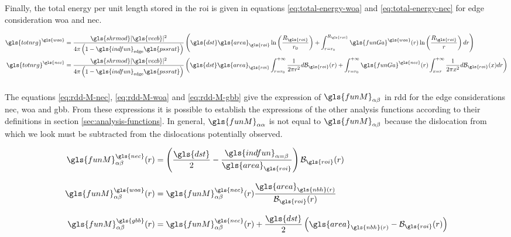 \medskip

Finally, the total energy per unit length stored in the \gls{roi} is given in equations \eqref{eq:total-energy-woa} and \eqref{eq:total-energy-nec} for edge consideration \gls{woa} and \gls{nec}.

\begin{align}
  \gls{totnrg}^{\gls{woa}} &=
    \frac{\gls{shrmod} | \gls{vecb} |^2}{4 \pi \left(1 - \gls{indfun}_{\mathrm{edge}} \gls{pssrat} \right)} \left( \gls{dst} \gls{area}_{\gls{roi}} \ln \left( \frac{R_{\gls{roi}}}{r_0} \right) + \int_{r=r_0}^{R_{\gls{roi}}} \gls{funGa}^{\gls{woa}} (r) \ln \left( \frac{R_{\gls{roi}}}{r} \right) dr \right)
    \label{eq:total-energy-woa}
  \\
  \gls{totnrg}^{\gls{nec}} &=
    \frac{\gls{shrmod} | \gls{vecb} |^2}{4 \pi \left(1 - \gls{indfun}_{\mathrm{edge}} \gls{pssrat} \right)} \left( \gls{dst} \gls{area}_{\gls{roi}} \int_{r=r_0}^{+\infty} \frac{1}{2 \pi r^2} d \mathcal{B}_{\gls{roi}}(r) + \int_{r=r_0}^{+\infty} \gls{funGa}^{\gls{nec}} (r) \int_{x=r}^{+\infty} \frac{1}{2 \pi x^2} d \mathcal{B}_{\gls{roi}}(x) dr \right)
    \label{eq:total-energy-nec}
\end{align}

\subsubsection{}

The equations \eqref{eq:rdd-M-nec}, \eqref{eq:rdd-M-woa} and \eqref{eq:rdd-M-gbb} give the expression of \( \gls{funM}_{\alpha \beta} \) in \gls{rdd} for the edge considerations \gls{nec}, \gls{woa} and \gls{gbb}.
From these expressions it is possible to establish the expressions of the other analysis functions according to their definitions in section \ref{sec:analysis-functions}.
In general, \( \gls{funM}_{\alpha \alpha} \) is not equal to \( \gls{funM}_{\alpha \beta} \) because the dislocation from which we look must be subtracted from the dislocations potentially observed.

\begin{align}
  \gls{funM}_{\alpha \beta}^{\gls{nec}} (r) &=
    \left( \frac{\gls{dst}}{2} - \frac{\gls{indfun}_{\alpha = \beta}}{\gls{area}_{\gls{roi}}} \right) \mathcal{B}_{\gls{roi}}(r)
    \label{eq:rdd-M-nec}
  \\[3mm]
  \gls{funM}_{\alpha \beta}^{\gls{woa}} (r) &=
    \gls{funM}_{\alpha \beta}^{\gls{nec}} (r) \frac{\gls{area}_{\gls{nbh}(r)}}{\mathcal{B}_{\gls{roi}}(r)}
    \label{eq:rdd-M-woa}
  \\[3mm]
  \gls{funM}_{\alpha \beta}^{\gls{gbb}} (r) &=
    \gls{funM}_{\alpha \beta}^{\gls{nec}} (r) + \frac{\gls{dst}}{2} \left( \gls{area}_{\gls{nbh}(r)} - \mathcal{B}_{\gls{roi}}(r) \right)
    \label{eq:rdd-M-gbb}
\end{align}

